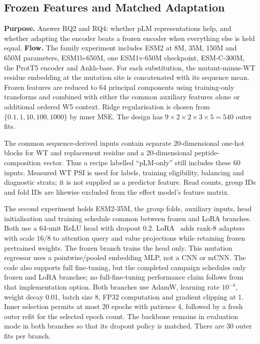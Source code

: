 \subsection{Frozen Features and Matched Adaptation}\label{sec:campaign-adaptation}
\textbf{Purpose.} Answer RQ2 and RQ4: whether pLM representations help, and whether adapting the encoder beats a frozen encoder when everything else is held equal.
\textbf{Flow.}
The family experiment includes ESM2 at 8M, 35M, 150M and 650M parameters, ESM1b-650M,
one ESM1v-650M checkpoint, ESM-C-300M, the ProtT5 encoder and Ankh-base. For each substitution,
the mutant-minus-WT residue embedding at the mutation site is concatenated with its sequence mean.
Frozen features are reduced to 64 principal components using training-only transforms and combined
with either the common auxiliary features alone or additional ordered W5 context. Ridge regularisation
is chosen from $\{0.1,1,10,100,1000\}$ by inner MSE. The design has
$9\times2\times2\times3\times5=540$ outer fits.

The common sequence-derived inputs contain separate 20-dimensional one-hot blocks for WT and
replacement residue and a 20-dimensional peptide-composition vector. Thus a recipe labelled
``pLM-only'' still includes these 60 inputs. Measured WT PSI is used for labels, training eligibility,
balancing and diagnostic strata; it is not supplied as a predictor feature. Read counts, group IDs
and fold IDs are likewise excluded from the effect model's feature matrix.

The second experiment holds ESM2-35M, the group folds, auxiliary inputs, head initialisation and
training schedule common between frozen and LoRA branches. Both use a 64-unit ReLU head with
dropout 0.2. LoRA~\citep{hu2022lora} adds rank-8 adapters with scale $16/8$ to attention query and
value projections while retaining frozen pretrained weights. The frozen branch trains the head only.
This mutation regressor uses a pointwise/pooled embedding MLP, not a CNN or mCNN. The code also
supports full fine-tuning, but the completed campaign schedules only frozen and LoRA branches;
no full-fine-tuning performance claim follows from that implementation option.
Both branches use AdamW, learning rate $10^{-4}$, weight decay 0.01, batch size 8, FP32 computation
and gradient clipping at 1. Inner selection permits at most 20 epochs with patience 4, followed by
a fresh outer refit for the selected epoch count. The backbone remains in evaluation mode in both
branches so that its dropout policy is matched. There are 30 outer fits per branch.

